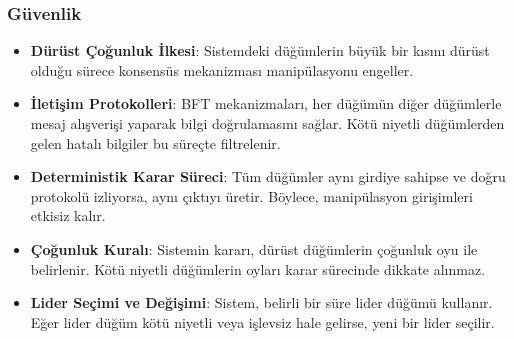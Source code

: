 \subsubsection{Güvenlik}

\begin{itemize}
    \item \textbf{Dürüst Çoğunluk İlkesi}: Sistemdeki düğümlerin büyük bir kısmı dürüst olduğu sürece konsensüs mekanizması manipülasyonu engeller.
    \item \textbf{İletişim Protokolleri}: BFT mekanizmaları, her düğümün diğer düğümlerle mesaj alışverişi yaparak bilgi doğrulamasını sağlar. Kötü niyetli düğümlerden gelen hatalı bilgiler bu süreçte filtrelenir.
    \item \textbf{Deterministik Karar Süreci}: Tüm düğümler aynı girdiye sahipse ve doğru protokolü izliyorsa, aynı çıktıyı üretir. Böylece, manipülasyon girişimleri etkisiz kalır.
    \item \textbf{Çoğunluk Kuralı}: Sistemin kararı, dürüst düğümlerin çoğunluk oyu ile belirlenir. Kötü niyetli düğümlerin oyları karar sürecinde dikkate alınmaz.
    \item \textbf{Lider Seçimi ve Değişimi}: Sistem, belirli bir süre lider düğümü kullanır. Eğer lider düğüm kötü niyetli veya işlevsiz hale gelirse, yeni bir lider seçilir.
\end{itemize}

\newpage